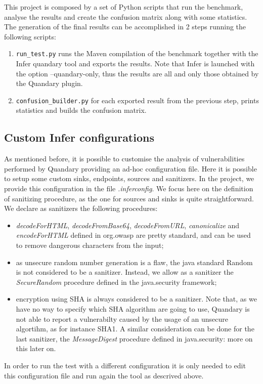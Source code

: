 \documentclass[../Report.tex]{subfiles}
\begin{document}
This project is composed by a set of Python scripts that run the benchmark, analyse the results and create the confusion matrix along with some statistics. 
The generation of the final results can be accomplished in 2 steps running the following scripts:

\begin{enumerate}
	\item \texttt{run\_test.py} runs the Maven compilation of the benchmark together with the
	Infer quandary tool and exports the results. Note that Infer is launched with the option
	--quandary-only, thus the results are all and only those obtained by the Quandary plugin. 
	\item \texttt{confusion\_builder.py} for each exported result from the previous step,
	prints statistics and builds the confusion matrix.
\end{enumerate}

\subsection{Custom Infer configurations}
As mentioned before, it is possible to customise the analysis of vulnerabilities performed by Quandary providing an ad-hoc configuration file. Here it is possible to setup some custom sinks, endpoints, sources and sanitizers. In the project, we provide this configuration in the file \emph{.inferconfig}. We focus here on the definition of sanitizing procedure, as the one for sources and sinks is quite straightforward. \\
We declare as sanitizers the following procedures:
\begin{itemize}
	\item \emph{decodeForHTML}, \emph{decodeFromBase64}, \emph{decodeFromURL},
	\emph{canonicalize} and \emph{encodeForHTML} defined in org.owasp are
	pretty standard, and can be used to remove dangerous characters from the 
	input;
	\item as unsecure random number generation is a flaw, the java standard Random is not
	considered to be a sanitizer. Instead, we allow as a sanitizer the \emph{SecureRandom}
	procedure defined in the java.security framework;
	\item encryption using SHA is always considered to be a sanitizer. Note that, as we have
	no way to specify which SHA algorithm are going to use, Quandary is not able to report
	a vulnerabilty caused by the usage of an unsecure algortihm, as for instance SHA1.
	A similar consideration can be done for the last sanitizer, the 
	\emph{MessageDigest} procedure defined in java.security: more
	on this later on.
\end{itemize}
In order to run the test with a different configuration it is only needed to edit this configuration file and run again the tool as descrived above.
\end{document}
